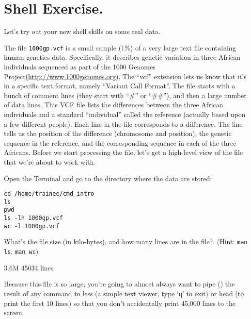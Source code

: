 \newpage
\section{Shell Exercise.}

\begin{information}
Let's try out your new shell skills on some real data.

The file \texttt{1000gp.vcf} is a small sample (1\%) of a very large text file containing human genetics data. Specifically, it describes genetic variation in three African individuals sequenced as part of the 1000 Genomes Project(\url{http://www.1000genomes.org}).
The ``vcf'' extension lets us know that it's in a specific text format, namely ``Variant Call Format''. The file starts with a bunch of comment lines (they start with ``#'' or ``##''), and then a large number of data lines. This VCF file lists the differences between the three African individuals and a standard ``individual'' called the reference (actually based upon a few different people). Each line in the file corresponds to a difference. The line tells us the position of the difference (chromosome and position), the genetic sequence in the reference, and the corresponding sequence in each of the three Africans.
Before we start processing the file, let's get a high-level view of the file that we're about to work with.

\end{information}

\begin{steps}
Open the Terminal and go to the directory where the data are stored:
\begin{lstlisting}
cd /home/trainee/cmd_intro
ls
pwd
ls -lh 1000gp.vcf
wc -l 1000gp.vcf
\end{lstlisting}
\end{steps}

\begin{questions}
What's the file size (in kilo-bytes), and how many lines are in the file?. (Hint: \texttt{man ls}, \texttt{man wc})
\begin{answer}
3.6M
45034 lines
\end{answer}
\end{questions}


\begin{note}
Because this file is so large, you're going to almost always want to pipe (\textpipe) the result of any command to less (a simple text viewer, type  `\texttt{q}' to exit) or head (to print the first 10 lines) so that you don't accidentally print 45,000 lines to the screen.
\end{note}

